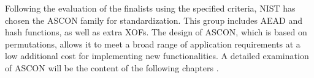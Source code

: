 Following the evaluation of the finalists using the specified criteria, NIST has chosen the ASCON family for standardization. This group includes AEAD and hash functions, as well as extra XOFs. The design of ASCON, which is based on permutations, allows it to meet a broad range of application requirements at a low additional cost for implementing new functionalities. A detailed examination of ASCON will be the content of the following chapters \cite{turan2021status}.
